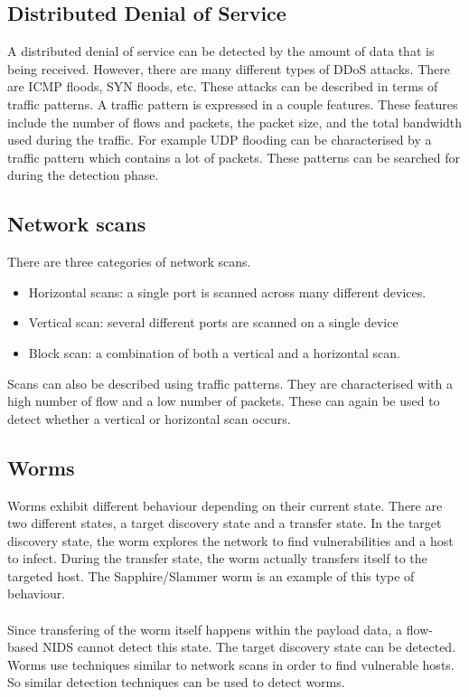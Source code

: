\subsection{Distributed Denial of Service}
A distributed denial of service can be detected by the amount of data that is being received. However, there are many different types of DDoS attacks. There are ICMP floods, SYN floods, etc. These attacks can be described in terms of traffic patterns. A traffic pattern is expressed in a couple features. These features include the number of flows and packets, the packet size, and the total bandwidth used during the traffic. For example UDP flooding can be characterised by a traffic pattern which contains a lot of packets. These patterns can be searched for during the detection phase. \cite{kim2004flow}
\subsection{Network scans}
There are three categories of network scans.
\begin{itemize}
\item Horizontal scans: a single port is scanned across many different devices.
\item Vertical scan: several different ports are scanned on a single device
\item Block scan: a combination of both a vertical and a horizontal scan.
\end{itemize}
\noindent Scans can also be described using traffic patterns. They are characterised with a high number of flow and a low number of packets. These can again be used to detect whether a vertical or horizontal scan occurs. \cite{IPFlow} \cite{kim2004flow}

\subsection{Worms}
Worms exhibit different behaviour depending on their current state. There are two different states, a target discovery state and a transfer state. In the target discovery state, the worm explores the network to find vulnerabilities and a host to infect. During the transfer state, the worm actually transfers itself to the targeted host. The Sapphire/Slammer worm is an example of this type of behaviour. \cite{moore2003inside}\\
\\
Since transfering of the worm itself happens within the payload data, a flow-based NIDS cannot detect this state. The target discovery state can be detected. Worms use techniques similar to network scans in order to find vulnerable hosts. So similar detection techniques can be used to detect worms. \cite{abuadlla2014flow}

